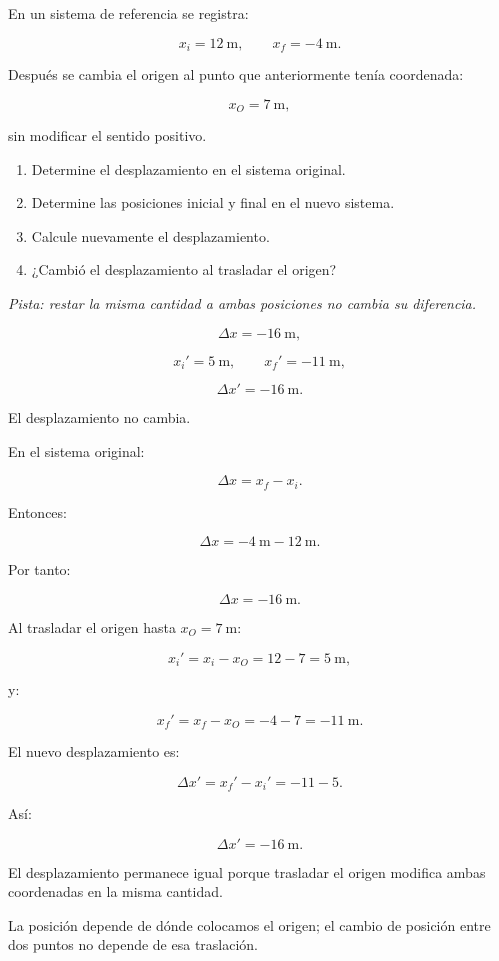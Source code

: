 \begin{ejercicio}
En un sistema de referencia se registra:

\[
x_i=\SI{12}{\meter},
\qquad
x_f=-\SI{4}{\meter}.
\]

Después se cambia el origen al punto que anteriormente tenía coordenada:

\[ x_O=\SI{7}{\meter}, \]

sin modificar el sentido positivo.

\begin{enumerate}[label=\alph*)]
    \item Determine el desplazamiento en el sistema original.
    \item Determine las posiciones inicial y final en el nuevo sistema.
    \item Calcule nuevamente el desplazamiento.
    \item ¿Cambió el desplazamiento al trasladar el origen?
\end{enumerate}

\textit{Pista: restar la misma cantidad a ambas posiciones no cambia su diferencia.}
\end{ejercicio}

\begin{respuesta}
\[
\Delta x=-\SI{16}{\meter},
\]

\[
x_i'=\SI{5}{\meter},
\qquad
x_f'=-\SI{11}{\meter},
\]

\[
\Delta x'=-\SI{16}{\meter}.
\]

El desplazamiento no cambia.
\end{respuesta}

\begin{explicacion}
En el sistema original:

\[
\Delta x=x_f-x_i.
\]

Entonces:

\[
\Delta x
=
-\SI{4}{\meter}
-
\SI{12}{\meter}.
\]

Por tanto:

\[ \boxed{\Delta x=-\SI{16}{\meter}}. \]

Al trasladar el origen hasta \(x_O=\SI{7}{\meter}\):

\[
x_i'=x_i-x_O
=
12-7
=
\SI{5}{\meter},
\]

y:

\[
x_f'=x_f-x_O
=
-4-7
=
-\SI{11}{\meter}.
\]

El nuevo desplazamiento es:

\[
\Delta x'
=
x_f'-x_i'
=
-11-5.
\]

Así:

\[ \boxed{\Delta x'=-\SI{16}{\meter}}. \]

El desplazamiento permanece igual porque trasladar el origen modifica ambas coordenadas en la misma cantidad.

La posición depende de dónde colocamos el origen; el cambio de posición entre dos puntos no depende de esa traslación.
\end{explicacion}


